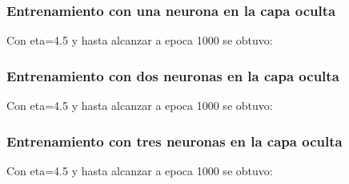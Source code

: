 \documentclass[11pt]{article}
\begin{document}
\subsubsection{Entrenamiento con una neurona en la capa oculta}
Con eta=4.5 y hasta alcanzar a epoca 1000 se obtuvo:
\subsubsection{Entrenamiento con dos neuronas en la capa oculta}
Con eta=4.5 y hasta alcanzar a epoca 1000 se obtuvo:
\subsubsection{Entrenamiento con tres neuronas en la capa oculta}
Con eta=4.5 y hasta alcanzar a epoca 1000 se obtuvo:
\end{document}
